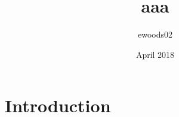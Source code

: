 \documentclass{article}
\title{aaa}
\author{ewoods02 }
\date{April 2018}
\begin{document}
\maketitle

\section{Introduction}
\end{document}
